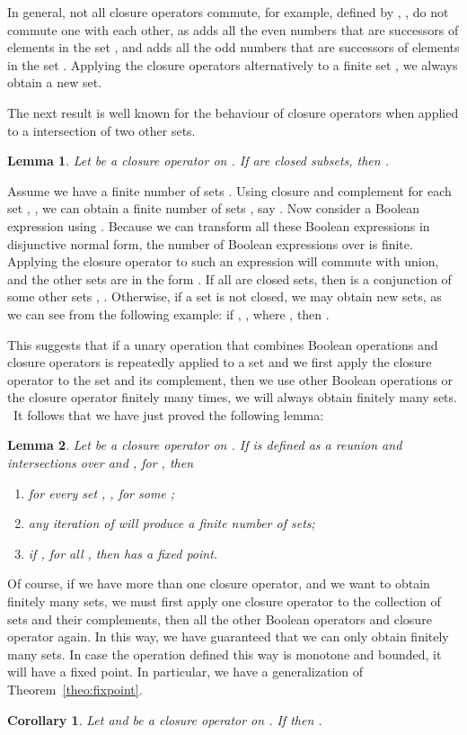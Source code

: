 \documentclass{article}
\newtheorem{lemma}{Lemma}
\newtheorem{corollary}{Corollary}
\begin{document}
In general, not all closure operators commute, for example, 
 defined by 
,
,
do not commute one with each other, as  adds all the even numbers that
are successors of elements in the set , and   adds all the odd numbers
that are successors of elements in the set . 
Applying the closure operators alternatively to a finite set , 
we always obtain a new set. 

The next result is well known for the behaviour of closure operators when applied 
to a intersection of two other sets.

\begin{lemma}  
\label{lkcap}
Let  be a closure operator on .
 If  are closed subsets,  then
.
\end{lemma}
Assume we have a finite number of sets .
Using closure and complement for each set , 
, we can obtain a 
finite number of sets \cite{Kuratowski1922}, say
  .
  Now consider a Boolean expression using .
Because we can transform all these Boolean expressions in
disjunctive normal form, the number of Boolean expressions
over  is finite.
Applying the closure operator to such an expression 
will commute with union, and the other sets 
are in the form 
.
If all   are closed sets,
then   
 is a conjunction of 
some other sets , .
Otherwise, if a set   is not closed,
we may obtain new sets, as we can see from the following example:
if 
 , , where ,
then
 .

This suggests that if a unary operation that combines Boolean 
operations and closure operators
is repeatedly applied to a set and we first apply the closure 
operator to the set and its complement, 
then we use other Boolean operations or the closure operator
finitely many times, we will always obtain  finitely many sets.
\ It follows that we have just proved the following lemma:
\begin{lemma}
\label{lem:fixgen}
Let   be a closure operator on . If   is defined as
a  reunion and intersections over  and , for ,
then 
\begin{enumerate}
\item for every set , , for some ;
\item any iteration of  will produce a finite number of sets;
\item if , for all , then  has a fixed point. 
\end{enumerate}
\end{lemma}
 
Of course, if we have more than one closure operator, and we want to obtain 
finitely many sets,
we must first apply one closure operator to the collection of sets and their
 complements,
 then all the other Boolean operators and closure operator again.
In this way, we have guaranteed that we can only obtain finitely many sets.
In case the operation defined this way is monotone and bounded, it will have 
a fixed point.
In particular, we have a generalization of Theorem~\ref{theo:fixpoint}.
\begin{corollary}
\label{cor:ot}
Let  and  be a closure operator on . 
If  then .
\end{corollary}
\end{document}
